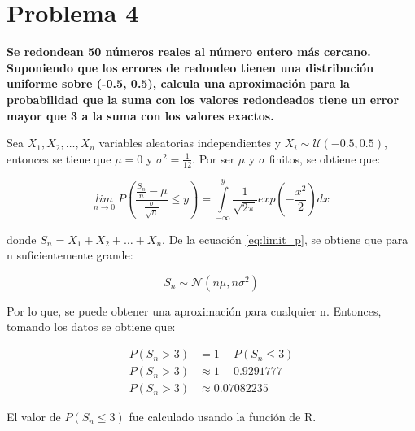 \section*{Problema 4}

\textbf{Se redondean 50 números reales al número entero más cercano. Suponiendo que los errores de redondeo tienen una distribución uniforme sobre (-0.5, 0.5), calcula una aproximación para la probabilidad que la suma con los valores redondeados tiene un error mayor que 3 a la suma con los valores exactos.}

Sea $X_1,X_2,\dots, X_n$ variables aleatorias independientes y $X_i \sim \mathcal{U}(-0.5,0.5)$, entonces se tiene que $\mu = 0$ y $\sigma^2 = \frac{1}{12}$. Por ser $\mu$ y $\sigma$ finitos, se obtiene que:

\begin{equation}
	\underset{n\rightarrow 0}{lim}\;P\left(\frac{\frac{S_n}{n}-\mu}{\frac{\sigma}{\sqrt{n}}} \leq y\right) = \int\limits_{-\infty}^{y}  \frac{1}{\sqrt{2\pi}} exp\left(-\frac{x^2}{2} \right ) dx \label{eq:limit_p}
\end{equation}

donde $S_n = X_1+X_2+\dots+X_n$. De la ecuación \ref{eq:limit_p}, se obtiene que para n suficientemente grande:

\begin{equation*}
	S_n \sim \mathcal{N}(n\mu,n\sigma^2)
\end{equation*}

Por lo que, se puede obtener una aproximación para cualquier n. Entonces, tomando los datos se obtiene que:

\begin{align*}
	P(S_n > 3) & = 1- P(S_n \leq 3)   \\
	P(S_n > 3) & \approx 1 -0.9291777 \\
	P(S_n > 3) & \approx 0.07082235
\end{align*}

El valor de $P(S_n \leq 3)$ fue calculado usando la función  de R.

